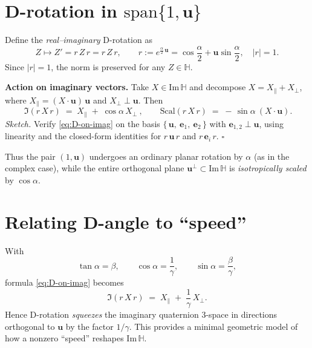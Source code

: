 \documentclass[11pt,a4paper]{article}
\newcommand{\HH}{\mathbb{H}}
\newcommand{\ImH}{\mathrm{Im}\,\mathbb{H}}
\newcommand{\Scal}{\mathrm{Scal}}
\newcommand{\uu}{\mathbf{u}}        %
\newcommand{\Sand}[2]{#1\,#2\,#1}   %
\begin{document}
\section{D-rotation in \texorpdfstring{\(\mathrm{span}\{1,\uu\}\)}{span\{1,u\}}}
Define the \emph{real--imaginary} D-rotation as
\begin{equation}
  Z \mapsto Z' = \Sand{r}{Z} = r\,Z\,r,\qquad
  r:=e^{\frac{\alpha}{2}\,\uu}=\cos\frac{\alpha}{2}+\uu\sin\frac{\alpha}{2},\quad |r|=1.
\end{equation}
Since \(|r|=1\), the norm is preserved for any \(Z\in\HH\).

\medskip
\noindent\textbf{Action on imaginary vectors.}
Take \(X\in\ImH\) and decompose \(X=X_\parallel+X_\perp\), where
\(X_\parallel=(X\!\cdot\!\uu)\,\uu\) and \(X_\perp\perp\uu\).
Then
\begin{equation}\label{eq:D-on-imag}
  \boxed{\ \Im(\Sand{r}{X}) \;=\; X_\parallel \;+\; \cos\alpha\,X_\perp\ },\qquad
  \Scal(\Sand{r}{X}) \;=\; -\,\sin\alpha\ (X\!\cdot\!\uu).
\end{equation}
\emph{Sketch.} Verify \eqref{eq:D-on-imag} on the basis
\(\{\,\uu,\ \mathbf e_1,\ \mathbf e_2\,\}\) with \(\mathbf e_{1,2}\perp\uu\),
using linearity and the closed-form identities for \(r\,\uu\,r\) and \(r\,\mathbf e_i\,r\).
\(\square\)

\medskip
\noindent Thus the pair \((1,\uu)\) undergoes an ordinary planar rotation by \(\alpha\) (as in the complex case),
while the entire orthogonal plane \(\uu^\perp\subset\ImH\) is \emph{isotropically scaled} by \(\cos\alpha\).

\section{Relating D-angle to ``speed''}
With
\begin{equation}
  \tan\alpha=\beta,\qquad
  \cos\alpha=\frac{1}{\gamma},\qquad
  \sin\alpha=\frac{\beta}{\gamma},
\end{equation}
formula \eqref{eq:D-on-imag} becomes
\begin{equation}\label{eq:gamma-squeeze}
  \Im(\Sand{r}{X}) \;=\; X_\parallel \;+\; \frac{1}{\gamma}\,X_\perp.
\end{equation}
Hence D-rotation \emph{squeezes} the imaginary quaternion 3-space in directions orthogonal to \(\uu\) by the factor \(1/\gamma\).
This provides a minimal geometric model of how a nonzero ``speed'' reshapes \(\ImH\).
\end{document}
